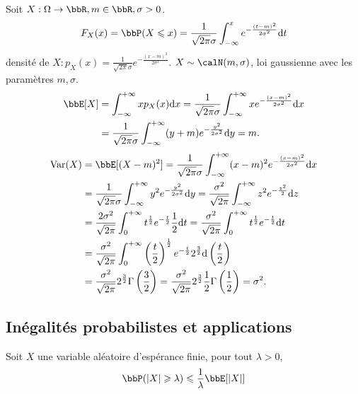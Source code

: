 Soit $X: \Omega \to \bbR, m \in \bbR, \sigma > 0$.
\[ F_X(x) = \bbP(X \leqslant x) = \frac{1}{\sqrt{2 \pi} \sigma} \int_{-\infty}^x e^{-\frac{(t - m)^2}{2 \sigma^2}} \dif t \]
densité de $X: {}p_X(x) = \frac{1}{\sqrt{2 \pi} \sigma} e^{-\frac{(x - m)^2}{2 \sigma^2}}$.
$X \sim \calN(m, \sigma)$, loi gaussienne avec les paramètres $m, \sigma$.
\begin{align*}
    \bbE[X] & = \int_{-\infty}^{+\infty} x {}p_X(x) \dif x
    = \frac{1}{\sqrt{2 \pi} \sigma} \int_{-\infty}^{+\infty} x e^{-\frac{(x - m)^2}{2 \sigma^2}} \dif x                \\
            & = \frac{1}{\sqrt{2 \pi} \sigma} \int_{-\infty}^{+\infty} (y + m) e^{-\frac{y^2}{2 \sigma^2}} \dif y = m.
\end{align*}
\begin{align*}
    \var(X) & = \bbE[(X - m)^2]
    = \frac{1}{\sqrt{2 \pi} \sigma} \int_{-\infty}^{+\infty} (x - m)^2 e^{-\frac{(x - m)^2}{2 \sigma^2}} \dif x                                                      \\
            & = \frac{1}{\sqrt{2 \pi} \sigma} \int_{-\infty}^{+\infty} y^2 e^{-\frac{y^2}{2 \sigma^2}} \dif y
    = \frac{\sigma^2}{\sqrt{2 \pi}} \int_{-\infty}^{+\infty} z^2 e^{-\frac{z^2}{2}} \dif z                                                                           \\
            & = \frac{2 \sigma^2}{\sqrt{2 \pi}} \int_0^{+\infty} t^{\frac{1}{2}} e^{-\frac{t}{2}} \frac{1}{2} \dif t
    = \frac{\sigma^2}{\sqrt{2 \pi}} \int_0^{+\infty} t^{\frac{1}{2}} e^{-\frac{t}{2}} \dif t                                                                         \\
            & = \frac{\sigma^2}{\sqrt{2 \pi}} \int_0^{+\infty} \left(\frac{t}{2}\right)^{\frac{1}{2}} e^{-\frac{t}{2}} 2^{\frac{3}{2}} \dif \left(\frac{t}{2}\right) \\
            & = \frac{\sigma^2}{\sqrt{2 \pi}} 2^{\frac{3}{2}} \Gamma\left(\frac{3}{2}\right)
    = \frac{\sigma^2}{\sqrt{2 \pi}} 2^{\frac{3}{2}} \frac{1}{2} \Gamma\left(\frac{1}{2}\right)
    = \sigma^2.
\end{align*}

\subsection{Inégalités probabilistes et applications}

\begin{thm}
    Soit $X$ une variable aléatoire d'espérance finie, pour tout $\lambda > 0$,
    \[ \bbP(\lrvert{X} \geqslant \lambda) \leqslant \frac{1}{\lambda} \bbE[\lrvert{X}] \]
\end{thm}

